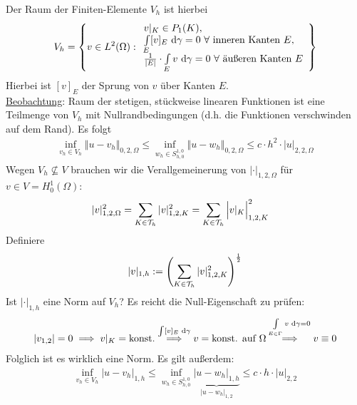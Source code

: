 Der Raum der Finiten-Elemente $V_h$ ist hierbei
\begin{align*}
	V_h=\left\lbrace v\in L^2(\Omega):
	\begin{array}{l}
		v|_K\in P_1(K), \\
		\int\limits_E [v]_E\text{ d}\gamma=0~\forall
		\text{ inneren Kanten $E$},\\
		\frac{1}{|E|}\cdot\int\limits_E v\text{ d}\gamma=0~\forall\text{ äußeren Kanten }E
	\end{array}
	\right\rbrace
\end{align*}
Hierbei ist $[v]_E$ der Sprung von $v$ über Kanten $E$.\\
\ul{Beobachtung}: Raum der stetigen, stückweise linearen Funktionen ist eine Teilmenge von $V_h$ mit Nullrandbedingungen (d.h. die Funktionen verschwinden auf dem Rand). Es folgt
\begin{align*}
	\inf\limits_{v_h\in V_h}\big\Vert u-v_h\big\Vert_{0,2,\Omega}
	\leq\inf\limits_{w_h\in S_{h,0}^{1,0}}\big\Vert u-w_h\big\Vert_{0,2,\Omega}
	\leq c\cdot h^2\cdot|u|_{2,2,\Omega}
\end{align*}
Wegen $V_h\not\subseteq V$ brauchen wir die Verallgemeinerung von $|\cdot|_{1,2,\Omega}$ für $v\in V=H^1_0(\Omega)$:
\begin{align*}
	|v|_{1,2,\Omega}^2
	&=\sum\limits_{K\in\mathcal{T}_h}|v|^2_{1,2,K}
	=\sum\limits_{K\in\mathcal{T}_h}\Big| v|_K\Big|^2_{1,2,K}
\end{align*}
Definiere
\begin{align*}
	|v|_{1,h}:=\left(\sum\limits_{K\in\mathcal{T}_h}|v|^2_{1,2,K}\right)^{\frac{1}{2}}
\end{align*}
Ist $|\cdot|_{1,h}$ eine Norm auf $V_h$? Es reicht die Null-Eigenschaft zu prüfen:
\begin{align*}
	|v_{1,2}|=0\implies v|_K=\text{konst.}
	\stackrel{\int[v]_E\text{ d}\gamma}{\implies} 
	v=\text{konst. auf }\Omega
	\stackrel{\int\limits_{E\in\Gamma} v\text{ d}\gamma=0}{\implies}
	v\equiv 0
\end{align*}
Folglich ist es wirklich eine Norm. Es gilt außerdem:
\begin{align*}
	\inf\limits_{v_h\in V_h}\big|u-v_h\big|_{1,h}
	\leq\inf\limits_{w_h\in S_{h,0}^{1,0}}\underbrace{\big|u-w_h\big|_{1,h}}_{|u-w_h|_{1,2}}
	\leq c\cdot h\cdot|u|_{2,2}
\end{align*}

